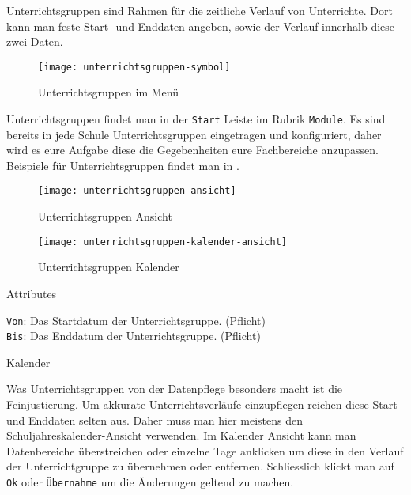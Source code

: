 \noindent
Unterrichtsgruppen sind Rahmen für die zeitliche Verlauf von Unterrichte. Dort kann man feste Start- und Enddaten angeben, sowie der Verlauf innerhalb diese zwei Daten.\\

\begin{wrapfigure}{r}{0.35\textwidth}
	\vspace{-14pt}
	\texttt{[image: unterrichtsgruppen-symbol]}
	\vspace{-5pt}
	\caption{Unterrichtsgruppen im Menü}
\end{wrapfigure}

\noindent
Unterrichtsgruppen findet man in der \texttt{Start} Leiste im Rubrik \texttt{Module}. Es sind bereits in jede Schule Unterrichtsgruppen eingetragen und konfiguriert, daher wird es eure Aufgabe diese die Gegebenheiten eure Fachbereiche anzupassen. Beispiele für Unterrichtsgruppen findet man in 
.\\


\begin{wrapfigure}{r}{0.35\textwidth}
	\vspace{-14pt}
	\label{fig:unterrichtsgruppen-symbol}
	\texttt{[image: unterrichtsgruppen-ansicht]}
	\vspace{-5pt}
	\caption{Unterrichtsgruppen Ansicht}
	\label{fig:unterrichtsgruppen-ansicht}
	\vspace{14pt}
	\texttt{[image: unterrichtsgruppen-kalender-ansicht]}
	\vspace{-5pt}
	\caption{Unterrichtsgruppen Kalender}
	\label{fig:unterrichtsgruppen-kalender-ansicht}
\end{wrapfigure}

\noindent
{\large Attributes\par}
\vspace{8pt}

\noindent
\texttt{Von}: Das Startdatum der Unterrichtsgruppe. (Pflicht)\\

\noindent
\texttt{Bis}: Das Enddatum der Unterrichtsgruppe. (Pflicht)\\

\noindent
{\large Kalender\par}
\vspace{8pt}

\noindent
Was Unterrichtsgruppen von der Datenpflege besonders macht ist die Feinjustierung. Um akkurate Unterrichtsverläufe einzupflegen reichen diese Start- und Enddaten selten aus. Daher muss man hier meistens den Schuljahreskalender-Ansicht verwenden. Im Kalender Ansicht kann man Datenbereiche überstreichen oder einzelne Tage anklicken um diese in den Verlauf der Unterrichtgruppe zu übernehmen oder entfernen. Schliesslich klickt man auf \texttt{Ok} oder \texttt{Übernahme} um die Änderungen geltend zu machen.






